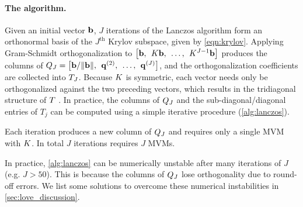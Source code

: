 \paragraph{The algorithm.}
Given an initial vector $\mathbf{b}$, $J$ iterations of the Lanczos algorithm form an orthonormal basis of the $J^\text{th}$ Krylov subspace, given by \cref{eqn:krylov}.
Applying Gram-Schmidt orthogonalization to $\left[ \mathbf{b}, \:\: K \mathbf{b}, \:\: \ldots, \:\: K^{J-1} \mathbf{b} \right]$ produces the columns of $Q_J = \left[ \mathbf{b}/\Vert \mathbf{b} \Vert, \:\: \mathbf{q}^{(2)}, \:\: \ldots, \:\: \mathbf{q}^{(J)} \right]$, and the orthogonalization coefficients are collected into $T_J$.
Because $K$ is symmetric, each vector needs only be orthogonalized against the two preceding vectors, which results in the tridiagonal structure of $T$ \cite{golub2012matrix}.
In practice, the columns of $Q_J$ and the sub-diagonal/diagonal entries of $T_j$ can be computed using a simple iterative procedure (\cref{alg:lanczos}).
%

%
Each iteration produces a new column of $Q_J$ and requires only a single MVM with $K$.
In total $J$ iterations requires $J$ MVMs.

In practice, \cref{alg:lanczos} can be numerically unstable after many iterations of $J$ (e.g. $J > 50$).
This is because the columns of $Q_J$ lose orthogonality due to round-off errors.
We list some solutions to overcome these numerical instabilities in \cref{sec:love_discussion}.



